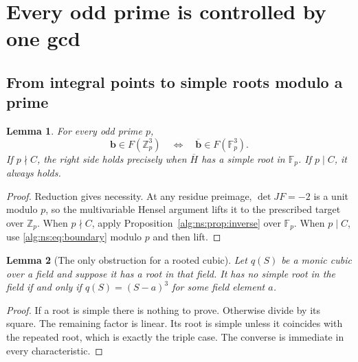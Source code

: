 \documentclass[11pt]{article}
\numberwithin{equation}{section}
\theoremstyle{plain}
\theoremstyle{plain}
\newtheorem{lemma}[lemma]{Lemma}
\theoremstyle{plain}
\theoremstyle{definition}
\theoremstyle{definition}
\theoremstyle{definition}
\theoremstyle{remark}
\newcommand{\Z}{\mathbb Z}\newcommand{\Q}{\mathbb Q}
\newcommand{\F}{\mathbb F}\newcommand{\A}{\mathbb A}\newcommand{\PP}{\mathbb P}
\newcommand{\target}{\boldsymbol b}
\begin{document}
\section{Every odd prime is controlled by one gcd}\label{alg:ns:sec:odd}

\subsection{From integral points to simple roots modulo a prime}
\begin{lemma}\label{alg:ns:lem:hensel-odd}
For every odd prime $p$,
\[
\target\in F(\Z_p^3)
\quad\Longleftrightarrow\quad
\overline{\target}\in F(\F_p^3).
\]
If $p\nmid C$, the right side holds precisely when $\overline H$ has a
simple root in $\F_p$. If $p\mid C$, it always holds.
\end{lemma}
\begin{proof}
Reduction gives necessity. At any residue preimage, $\det JF=-2$ is a
unit modulo $p$, so the multivariable Hensel argument lifts it to the
prescribed target over $\Z_p$. When $p\nmid C$, apply
Proposition~\ref{alg:ns:prop:inverse} over $\F_p$. When $p\mid C$, use
\eqref{alg:ns:eq:boundary} modulo $p$ and then lift.
\end{proof}

\begin{lemma}[The only obstruction for a rooted cubic]\label{alg:ns:lem:triple}
Let $q(S)$ be a monic cubic over a field and suppose it has a root in
that field. It has no simple root in the field if and only if
$q(S)=(S-a)^3$ for some field element $a$.
\end{lemma}
\begin{proof}
If a root is simple there is nothing to prove. Otherwise divide by its
square. The remaining factor is linear. Its root is simple unless it
coincides with the repeated root, which is exactly the triple case.
The converse is immediate in every characteristic.
\end{proof}
\end{document}
